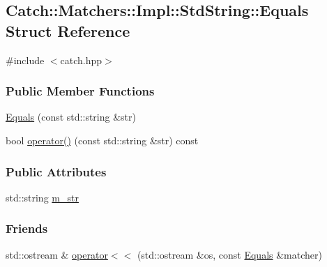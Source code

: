 \hypertarget{structCatch_1_1Matchers_1_1Impl_1_1StdString_1_1Equals}{\subsection{Catch\-:\-:Matchers\-:\-:Impl\-:\-:Std\-String\-:\-:Equals Struct Reference}
\label{structCatch_1_1Matchers_1_1Impl_1_1StdString_1_1Equals}
}


{\ttfamily \#include $<$catch.\-hpp$>$}

\subsubsection*{Public Member Functions}
\begin{DoxyCompactItemize}
\item 
\hyperlink{structCatch_1_1Matchers_1_1Impl_1_1StdString_1_1Equals_a11a973d939bcf2ee056157f43bdfb536}{Equals} (const std\-::string \&str)
\item 
bool \hyperlink{structCatch_1_1Matchers_1_1Impl_1_1StdString_1_1Equals_aa6c1e3ad1e27d3569cfb38d89e7e1a2c}{operator()} (const std\-::string \&str) const 
\end{DoxyCompactItemize}
\subsubsection*{Public Attributes}
\begin{DoxyCompactItemize}
\item 
std\-::string \hyperlink{structCatch_1_1Matchers_1_1Impl_1_1StdString_1_1Equals_a41fc4413185f47d8b6d8da7a55078921}{m\-\_\-str}
\end{DoxyCompactItemize}
\subsubsection*{Friends}
\begin{DoxyCompactItemize}
\item 
std\-::ostream \& \hyperlink{structCatch_1_1Matchers_1_1Impl_1_1StdString_1_1Equals_a373e9d0e4cc18bd5ffa530140e035387}{operator$<$$<$} (std\-::ostream \&os, const \hyperlink{structCatch_1_1Matchers_1_1Impl_1_1StdString_1_1Equals}{Equals} \&matcher)
\end{DoxyCompactItemize}


